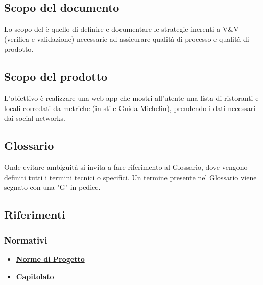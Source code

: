 \subsection{Scopo del documento}
Lo scopo del \PdQ è quello di definire e documentare le strategie inerenti a V\&V (verifica
e validazione) necessarie ad assicurare qualità di processo e qualità di prodotto.

\subsection{Scopo del prodotto}
L'obiettivo è realizzare una web app che mostri all'utente una lista di ristoranti e locali 
corredati da metriche (in stile Guida Michelin), prendendo i dati necessari dai social networks.

\subsection{Glossario}
Onde evitare ambiguità si invita a fare riferimento al Glossario, dove vengono definiti tutti 
i termini tecnici o specifici. Un termine presente nel Glossario viene segnato con una "G" in pedice.

\subsection{Riferimenti}
\subsubsection{Normativi}
\begin{itemize}
    \item \href{https://github.com/Bug-s-Bunny-Team/docs/tree/master/src/Interni/Norme_Di_Progetto}{\textbf{Norme di Progetto}}
    \item \href{https://www.math.unipd.it/~tullio/IS-1/2021/Progetto/C4p.pdf}{\textbf{Capitolato}}
\end{itemize}

